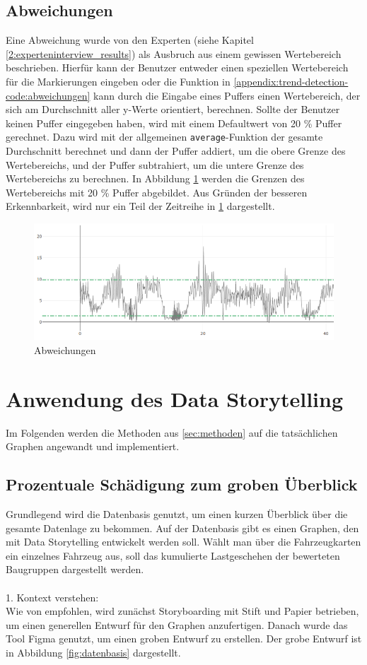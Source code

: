 \subsection{Abweichungen}
Eine Abweichung wurde von den Experten (siehe Kapitel \ref{2:experteninterview_results}) als Ausbruch aus einem gewissen Wertebereich beschrieben. Hierfür kann der Benutzer entweder einen speziellen Wertebereich für die Markierungen eingeben oder die Funktion in \ref{appendix:trend-detection-code:abweichungen} kann durch die Eingabe eines Puffers einen Wertebereich, der sich am Durchschnitt aller y-Werte orientiert, berechnen. Sollte der Benutzer keinen Puffer eingegeben haben, wird mit einem Defaultwert von 20  \% Puffer gerechnet. Dazu wird mit der allgemeinen \texttt{average}-Funktion der gesamte Durchschnitt berechnet und dann der Puffer addiert, um die obere Grenze des Wertebereichs, und der Puffer subtrahiert, um die untere Grenze des Wertebereichs zu berechnen. In Abbildung \ref{fig:deviations} werden die Grenzen des Wertebereichs mit 20  \% Puffer abgebildet. Aus Gründen der besseren Erkennbarkeit, wird nur ein Teil der Zeitreihe in \ref{fig:deviations} dargestellt.
\begin{figure}[h!]
\centering
\includegraphics[width=\textwidth]{gfx/deviations.png}
\caption{Abweichungen}
\label{fig:deviations}
\end{figure}
\section{Anwendung des Data Storytelling}
Im Folgenden werden die Methoden aus \ref{sec:methoden} auf die tatsächlichen Graphen angewandt und implementiert.
\subsection{Prozentuale Schädigung zum groben Überblick}\label{section:Prozentuale_Schädigung}
Grundlegend wird die Datenbasis genutzt, um einen kurzen Überblick über die gesamte Datenlage zu bekommen. Auf der Datenbasis gibt es einen Graphen, den mit Data Storytelling entwickelt werden soll. Wählt man über die Fahrzeugkarten ein einzelnes Fahrzeug aus, soll das kumulierte Lastgeschehen der bewerteten Baugruppen dargestellt werden. \\\\
1. Kontext verstehen:\\
Wie von \cite{Knaflic.2016} empfohlen, wird zunächst Storyboarding mit Stift und Papier betrieben, um einen generellen Entwurf für den Graphen anzufertigen. Danach wurde das Tool Figma \cite{FigmaGmbH.2024} genutzt, um einen groben Entwurf zu erstellen. Der grobe Entwurf ist in Abbildung \ref{fig:datenbasis} dargestellt.

